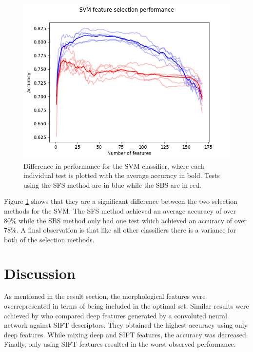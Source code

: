 \documentclass{kththesis}
\begin{document}
\begin{figure}[h!]
  \begin{center}
    \includegraphics[scale=0.8]{../new_plots/svm_graph.png}
    \caption{Difference in performance for the SVM classifier, where each individual test is plotted with the average accuracy in bold. Tests using the SFS method are in blue while the SBS are in red.}
    \label{fig:svm}
  \end{center}
\end{figure}

Figure \ref{fig:svm} shows that they are a significant difference between the two selection methods for the SVM. The SFS method achieved an average accuracy of over 80\% while the SBS method only had one test which achieved an accuracy of over 78\%. A final observation is that like all other classifiers there is a variance for both of the selection methods.

\chapter{Discussion}

As mentioned in the result section, the morphological features were overrepresented in terms of being included in the optimal set. Similar results were achieved by \parencite{Zhang}
who compared deep features generated by a convoluted neural network against SIFT descriptors. They obtained the highest accuracy using only deep features. While mixing deep and SIFT features, the accuracy was decreased. Finally, only using SIFT features resulted in the worst observed performance. 
\end{document}
